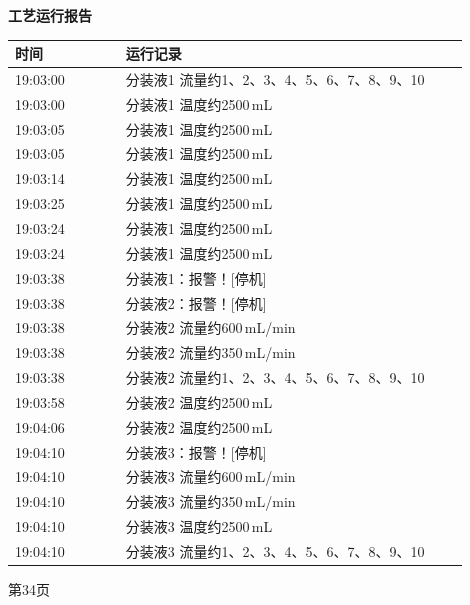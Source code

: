 \documentclass[UTF8,10pt,a4paper,fontset=fandol]{ctexart}
\begin{document}
\begin{minipage}[t]{0.47\linewidth}
\centering
\textbf{工艺运行报告}

\vspace{2mm}
\scriptsize
\begin{tabular}{|p{0.22\linewidth}|p{0.68\linewidth}|}
\hline
时间 & 运行记录 \\ \hline
19:03:00 & 分装液1 流量约1、2、3、4、5、6、7、8、9、10 \\ \hline
19:03:00 & 分装液1 温度约2500\,mL \\ \hline
19:03:05 & 分装液1 温度约2500\,mL \\ \hline
19:03:05 & 分装液1 温度约2500\,mL \\ \hline
19:03:14 & 分装液1 温度约2500\,mL \\ \hline
19:03:25 & 分装液1 温度约2500\,mL \\ \hline
19:03:24 & 分装液1 温度约2500\,mL \\ \hline
19:03:24 & 分装液1 温度约2500\,mL \\ \hline
19:03:38 & 分装液1：报警！[停机] \\ \hline
19:03:38 & 分装液2：报警！[停机] \\ \hline
19:03:38 & 分装液2 流量约600\,mL/min \\ \hline
19:03:38 & 分装液2 流量约350\,mL/min \\ \hline
19:03:38 & 分装液2 流量约1、2、3、4、5、6、7、8、9、10 \\ \hline
19:03:58 & 分装液2 温度约2500\,mL \\ \hline
19:04:06 & 分装液2 温度约2500\,mL \\ \hline
19:04:10 & 分装液3：报警！[停机] \\ \hline
19:04:10 & 分装液3 流量约600\,mL/min \\ \hline
19:04:10 & 分装液3 流量约350\,mL/min \\ \hline
19:04:10 & 分装液3 温度约2500\,mL \\ \hline
19:04:10 & 分装液3 流量约1、2、3、4、5、6、7、8、9、10 \\ \hline
\end{tabular}

\vspace{2mm}
第34页
\end{minipage}

\vspace{8mm}
\end{document}
